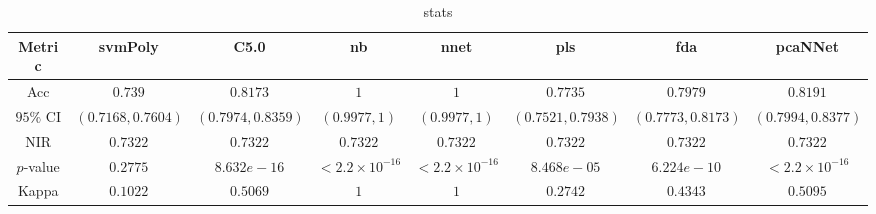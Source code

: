 \begin{table}[!ht]
	\centering
	\begin{tabular}{|c|c|c|c|c|c|c|c|}
		\hline
		Metric & svmPoly & C5.0 & nb & nnet & pls & fda & pcaNNet \\ \hline
		Acc & $0.739$ & $0.8173$ & $1$ & $1$ & $0.7735$ & $0.7979$ & $0.8191$ \\ \hline
		$95\%$ CI & $(0.7168, 0.7604)$ & $(0.7974, 0.8359)$ & $(0.9977, 1)$ & $(0.9977, 1)$ & $(0.7521, 0.7938)$ & $(0.7773, 0.8173)$ & $(0.7994, 0.8377)$ \\ \hline
		NIR & $0.7322$ & $0.7322$ & $0.7322$ & $0.7322$ & $0.7322$ & $0.7322$ & $0.7322$ \\ \hline
		$p$-value & $0.2775$ & $8.632e-16$ & $< 2.2 \times {10}^{-16}$ & $< 2.2 \times {10}^{-16}$ & $8.468e-05$ & $6.224e-10$ & $< 2.2 \times {10}^{-16}$ \\ \hline
		Kappa & $0.1022$ & $0.5069$ & $1$ & $1$ & $0.2742$ & $0.4343$ & $0.5095$ \\ \hline
	\end{tabular}
	\caption{stats}
	\label{tab:stats}
\end{table}
